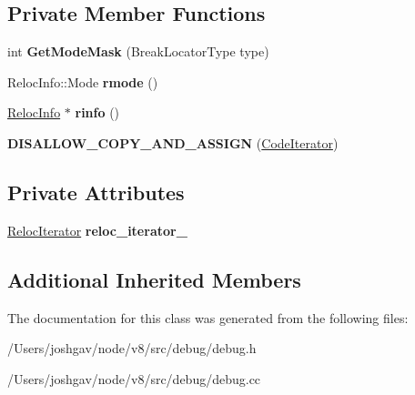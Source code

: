 \subsection*{Private Member Functions}
\begin{DoxyCompactItemize}
\item 
int {\bfseries Get\+Mode\+Mask} (Break\+Locator\+Type type)\hypertarget{classv8_1_1internal_1_1_break_location_1_1_code_iterator_ae3638e2f7335678746d3709ab7c0cecf}{}\label{classv8_1_1internal_1_1_break_location_1_1_code_iterator_ae3638e2f7335678746d3709ab7c0cecf}

\item 
Reloc\+Info\+::\+Mode {\bfseries rmode} ()\hypertarget{classv8_1_1internal_1_1_break_location_1_1_code_iterator_ad1d73f43357fccc7bb5b5c3eb43f37b0}{}\label{classv8_1_1internal_1_1_break_location_1_1_code_iterator_ad1d73f43357fccc7bb5b5c3eb43f37b0}

\item 
\hyperlink{classv8_1_1internal_1_1_reloc_info}{Reloc\+Info} $\ast$ {\bfseries rinfo} ()\hypertarget{classv8_1_1internal_1_1_break_location_1_1_code_iterator_a2c2d73e7b9ea1e2acb0d538b418a5e3c}{}\label{classv8_1_1internal_1_1_break_location_1_1_code_iterator_a2c2d73e7b9ea1e2acb0d538b418a5e3c}

\item 
{\bfseries D\+I\+S\+A\+L\+L\+O\+W\+\_\+\+C\+O\+P\+Y\+\_\+\+A\+N\+D\+\_\+\+A\+S\+S\+I\+GN} (\hyperlink{classv8_1_1internal_1_1_break_location_1_1_code_iterator}{Code\+Iterator})\hypertarget{classv8_1_1internal_1_1_break_location_1_1_code_iterator_a46a83ce6f80d08d26ff6fc93a45dd3bc}{}\label{classv8_1_1internal_1_1_break_location_1_1_code_iterator_a46a83ce6f80d08d26ff6fc93a45dd3bc}

\end{DoxyCompactItemize}
\subsection*{Private Attributes}
\begin{DoxyCompactItemize}
\item 
\hyperlink{classv8_1_1internal_1_1_reloc_iterator}{Reloc\+Iterator} {\bfseries reloc\+\_\+iterator\+\_\+}\hypertarget{classv8_1_1internal_1_1_break_location_1_1_code_iterator_afe934c2461d3dbfc78e5e35f03206f25}{}\label{classv8_1_1internal_1_1_break_location_1_1_code_iterator_afe934c2461d3dbfc78e5e35f03206f25}

\end{DoxyCompactItemize}
\subsection*{Additional Inherited Members}


The documentation for this class was generated from the following files\+:\begin{DoxyCompactItemize}
\item 
/\+Users/joshgav/node/v8/src/debug/debug.\+h\item 
/\+Users/joshgav/node/v8/src/debug/debug.\+cc\end{DoxyCompactItemize}
